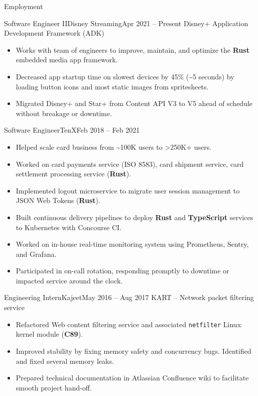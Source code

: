 \documentclass[]{mcdowellcv}
\begin{document}
	\makeheader
	
	\begin{cvsection}{Employment}
		\begin{cvsubsection}{Software Engineer II}{Disney Streaming}{Apr 2021 -- Present}
            Disney+ Application Development Framework (ADK)
			\begin{itemize}
                \item Works with team of engineers to improve, maintain, and optimize the \textbf{Rust} embedded media app framework.
				\item Decreased app startup time on slowest devices by 45\% (\sim5 seconds) by loading button icons and most static images from spritesheets.
				\item Migrated Disney+ and Star+ from Content API V3 to V5 ahead of schedule without breakage or downtime.
			\end{itemize}
		\end{cvsubsection}
		
        \begin{cvsubsection}{Software Engineer}{TenX}{Feb 2018 -- Feb 2021}
			\begin{itemize}
				\item Helped scale card business from \sim100K users to >250K+ users.
                \item Worked on card payments service (ISO 8583), card shipment service, card settlement processing service (\textbf{Rust}).
                \item Implemented logout microservice to migrate user session management to JSON Web Tokens (\textbf{Rust}).
                \item Built continuous delivery pipelines to deploy \textbf{Rust} and \textbf{TypeScript} services to Kubernetes with Concourse CI.
                \item Worked on in-house real-time monitoring system using Prometheus, Sentry, and Grafana.
                \item Participated in on-call rotation, responding promptly to downtime or impacted service around the clock.
			\end{itemize}
		\end{cvsubsection}

        \begin{cvsubsection}{Engineering Intern}{Kajeet}{May 2016 -- Aug 2017}
            KART -- Network packet filtering service
            \begin{itemize}
                \item Refactored Web content filtering service and associated \texttt{netfilter} Linux kernel module (\textbf{C89}).
                \item Improved stability by fixing memory safety and concurrency bugs. Identified and fixed several memory leaks.
                \item Prepared technical documentation in Atlassian Confluence wiki to facilitate smooth project hand-off.
            \end{itemize}
        \end{cvsubsection}
	\end{cvsection}
	
\end{document}

